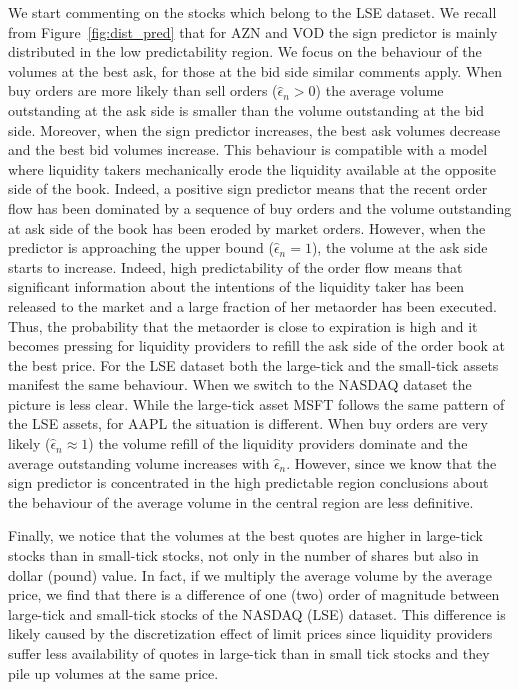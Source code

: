 \documentclass[12pt]{iopart}
\begin{document}
We start commenting on the stocks which belong to the LSE dataset. We recall from Figure~\ref{fig:dist_pred} that for AZN and VOD the sign predictor is mainly distributed in the low predictability region. We focus on the behaviour of the volumes at the best ask, for those at the bid side similar comments apply. When buy orders are more likely than sell orders ($\hat{\epsilon}_n>0$) the average volume outstanding at the ask side is smaller than the volume outstanding at the bid side. Moreover, when the sign predictor increases, the best ask volumes decrease and the best bid volumes increase. This behaviour is compatible with a model where liquidity takers mechanically erode the liquidity available at the opposite side of the book. Indeed, a positive sign predictor means that the recent order flow has been dominated by a sequence of buy orders and the volume outstanding at ask side of the book has been eroded by market orders. However, when the predictor is approaching the upper bound ($\hat{\epsilon}_n=1$), the volume at the ask side starts to increase. Indeed, high predictability of the order flow means that significant information about the intentions of the liquidity taker has been released to the market and a large fraction of her metaorder has been executed. Thus, the probability that the metaorder is close to expiration is high and it becomes pressing for liquidity providers to refill the ask side of the order book at the best price. For the LSE dataset both the large-tick and the small-tick assets manifest the same behaviour. When we switch to the NASDAQ dataset the picture is less clear. While the large-tick asset MSFT follows the same pattern of the LSE assets, for AAPL the situation is different. When buy orders are very likely ($\hat{\epsilon}_n \approx 1$) the volume refill of the liquidity providers dominate and the average outstanding volume increases with $\hat{\epsilon}_n$. However, since we know that the sign predictor is concentrated in the high predictable region conclusions about the behaviour of the average volume in the central region are less definitive.

Finally, we notice that the volumes at the best quotes are higher in large-tick stocks than in small-tick stocks, not only in the number of shares but also in dollar (pound) value. In fact, if we multiply the average volume by the average price, we find that there is a difference of one (two) order of magnitude between large-tick and small-tick stocks of the NASDAQ (LSE) dataset. This difference is likely caused by the discretization effect of limit prices since liquidity providers suffer less availability of quotes in large-tick than in small tick stocks and they pile up volumes at the same price.
\end{document}
